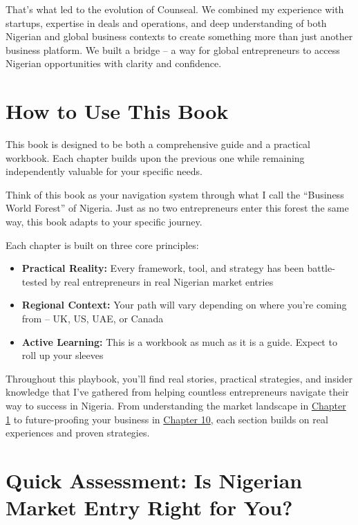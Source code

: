 That's what led to the evolution of Counseal. We combined my experience with startups, expertise in deals and operations, and deep understanding of both Nigerian and global business contexts to create something more than just another business platform. We built a bridge – a way for global entrepreneurs to access Nigerian opportunities with clarity and confidence.

\section{How to Use This Book}\label{sec:how-to-use}

\begin{importantbox}
This book is designed to be both a comprehensive guide and a practical workbook. Each chapter builds upon the previous one while remaining independently valuable for your specific needs.
\end{importantbox}

Think of this book as your navigation system through what I call the ``Business World Forest'' of Nigeria. Just as no two entrepreneurs enter this forest the same way, this book adapts to your specific journey.

Each chapter is built on three core principles:
\begin{itemize}
    \item \textbf{Practical Reality:} Every framework, tool, and strategy has been battle-tested by real entrepreneurs in real Nigerian market entries
    \item \textbf{Regional Context:} Your path will vary depending on where you're coming from – UK, US, UAE, or Canada
    \item \textbf{Active Learning:} This is a workbook as much as it is a guide. Expect to roll up your sleeves
\end{itemize}

Throughout this playbook, you'll find real stories, practical strategies, and insider knowledge that I've gathered from helping countless entrepreneurs navigate their way to success in Nigeria. From understanding the market landscape in \hyperref[ch:understanding-the-nigerian-business-landscape]{Chapter 1} to future-proofing your business in \hyperref[ch:future-proofing-your-business]{Chapter 10}, each section builds on real experiences and proven strategies.

\section{Quick Assessment: Is Nigerian Market Entry Right for You?}\label{sec:quick-assessment}

